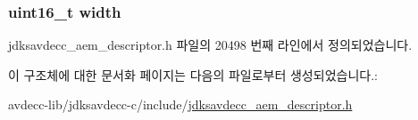 \subsubsection[{\texorpdfstring{width}{width}}]{\setlength{\rightskip}{0pt plus 5cm}uint16\+\_\+t width}\hypertarget{structjdksavdecc__descriptor__matrix_ad0eab1042455a2067c812ab8071d5376}{}\label{structjdksavdecc__descriptor__matrix_ad0eab1042455a2067c812ab8071d5376}


jdksavdecc\+\_\+aem\+\_\+descriptor.\+h 파일의 20498 번째 라인에서 정의되었습니다.



이 구조체에 대한 문서화 페이지는 다음의 파일로부터 생성되었습니다.\+:\begin{DoxyCompactItemize}
\item 
avdecc-\/lib/jdksavdecc-\/c/include/\hyperlink{jdksavdecc__aem__descriptor_8h}{jdksavdecc\+\_\+aem\+\_\+descriptor.\+h}\end{DoxyCompactItemize}
